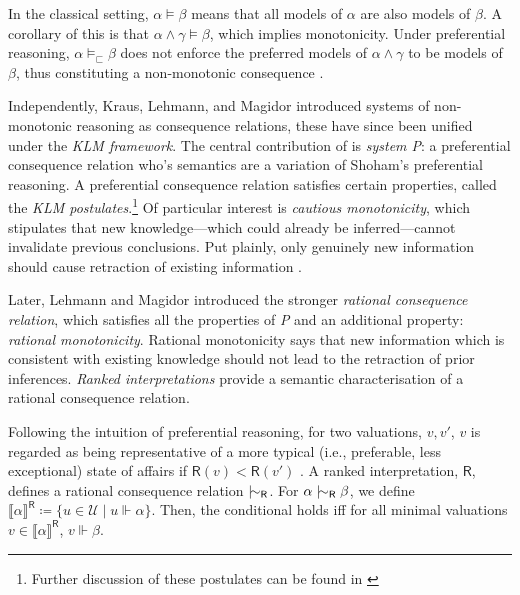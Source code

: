 %
In the classical setting, $\alpha \vDash \beta$ means that all models of $\alpha$ are also models of $\beta$. A corollary of this is that $\alpha \wedge \gamma \vDash \beta$, which implies monotonicity. Under preferential reasoning, $\alpha \vDash_\sqsubset \beta$ does not enforce the preferred models of $\alpha \wedge \gamma$ to be models of $\beta$, thus constituting a non-monotonic consequence \cite{shoham1987nonmonotonic}.

Independently, Kraus, Lehmann, and Magidor introduced systems of non-monotonic reasoning as consequence relations, these have since been unified under the \textit{KLM framework}. The central contribution of \cite{kraus1990nonmonotonic} is \textit{system P}: a preferential consequence relation who's semantics are a variation of Shoham's preferential reasoning. A preferential consequence relation satisfies certain properties, called the \textit{KLM postulates}.\footnote{Further discussion of these postulates can be found in \cite{kraus1990nonmonotonic}} Of particular interest is \textit{cautious monotonicity}, which stipulates that new knowledge—which could already be inferred—cannot invalidate previous conclusions. Put plainly, only genuinely new information should cause retraction of existing information \cite{kraus1990nonmonotonic,kaliski2020overview}.

Later, Lehmann and Magidor \cite{lehmann1994what} introduced the stronger  \textit{rational consequence relation}, which  satisfies all the properties of \textit{P} and an additional property: \textit{rational monotonicity}. Rational monotonicity says that new information which is consistent with existing knowledge should not lead to the retraction of prior inferences. \textit{Ranked interpretations} provide a semantic characterisation of a rational consequence relation.


Following the intuition of preferential reasoning, for two valuations, $v,v'$, $v$ is regarded as being representative of a more typical (i.e., preferable, less exceptional) state of affairs if $\mathsf{R}(v) < \mathsf{R}(v')$ \cite{lehmann1994what}. A ranked interpretation, $\mathsf{R}$, defines a rational consequence relation $\twiddle_\mathsf{R}$. For $\alpha \twiddle_\mathsf{R} \beta$, we define $\llbracket \alpha \rrbracket^\mathsf{R} \coloneq \{u \in \mathcal{U} \mid u \Vdash \alpha\}$. Then, the conditional holds iff for all minimal valuations $v \in \llbracket \alpha \rrbracket^\mathsf{R}$, $v \Vdash \beta$.

